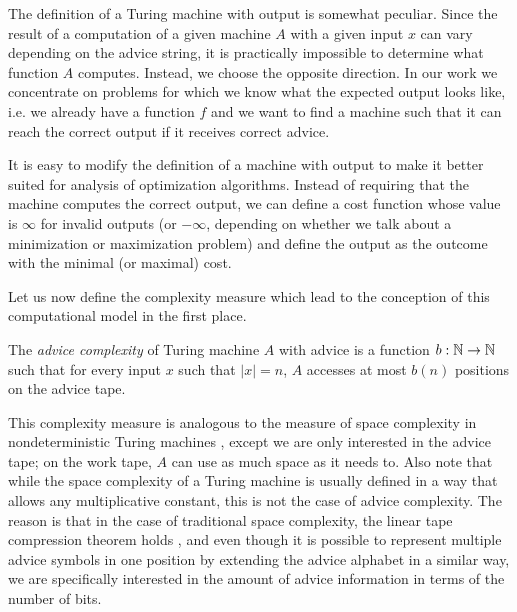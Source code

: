 The definition of a Turing machine with output is somewhat peculiar. Since
the result of a computation of a given machine $A$ with a given input $x$
can vary depending on the advice string, it is practically impossible to
determine what function $A$ computes. Instead, we choose the opposite
direction. In our work we concentrate on problems for which we know what
the expected output looks like, i.e. we already have a function $f$ and we
want to find a machine such that it can reach the correct output if it
receives correct advice.

It is easy to modify the definition of a machine with output to make it
better suited for analysis of optimization algorithms. Instead of
requiring that the machine computes the correct output, we can define a
cost function whose value is $\infty$ for invalid outputs (or $-\infty$,
depending on whether we talk about a minimization or maximization problem)
and define the output as the outcome with the minimal (or maximal) cost.

Let us now define the complexity measure which lead to the conception of
this computational model in the first place.

\begin{definition}\label{definition:offline-advice-complexity}
    The \emph{advice complexity} of Turing machine $A$ with advice is a
    function $b: \mathbb{N} \to \mathbb{N}$ such that for every input $x$ such that $|x| =
    n$, $A$ accesses at most $b(n)$ positions on the advice tape.
\end{definition}

This complexity measure is analogous to the measure of space complexity in
nondeterministic Turing machines \cite{nspace}, except we are only
interested in the advice tape; on the work tape, $A$ can use as much space
as it needs to. Also note that while the space complexity of a Turing
machine is usually defined in a way that allows any multiplicative
constant, this is not the case of advice complexity. The reason is that
in the case of traditional space complexity, the linear tape compression
theorem holds \cite{tape-compression}, and even though it is possible to
represent multiple advice symbols in one position by extending the advice
alphabet in a similar way, we are specifically interested in the amount of
advice information in terms of the number of bits.
